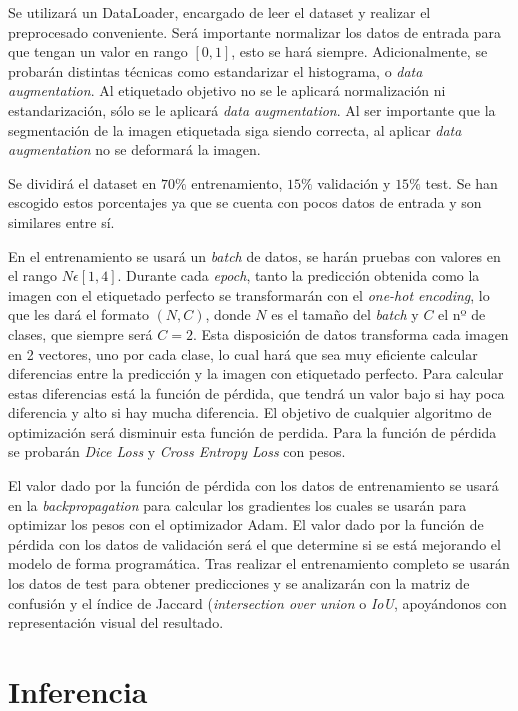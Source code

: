 Se utilizará un DataLoader, encargado de leer el dataset y realizar el preprocesado conveniente. Será importante normalizar los datos de entrada para que tengan un valor en rango $ [0, 1] $, esto se hará siempre. Adicionalmente, se probarán distintas técnicas como estandarizar el histograma, o \textit{data augmentation}. Al etiquetado objetivo no se le aplicará normalización ni estandarización, sólo se le aplicará \textit{data augmentation}. Al ser importante que la segmentación de la imagen etiquetada siga siendo correcta, al aplicar \textit{data augmentation} no se deformará la imagen.

Se dividirá el dataset en $ 70\% $ entrenamiento, $ 15\% $ validación y $ 15\% $ test. Se han escogido estos porcentajes ya que se cuenta con pocos datos de entrada y son similares entre sí.

En el entrenamiento se usará un \textit{batch} de datos, se harán pruebas con valores en el rango $N\epsilon[1,4]$. Durante cada \textit{epoch}, tanto la predicción obtenida como la imagen con el etiquetado perfecto se transformarán con el \textit{one-hot encoding}, lo que les dará el formato $(N, C)$, donde $N$ es el tamaño del \textit{batch} y $C$ el nº de clases, que siempre será $C=2$. Esta disposición de datos transforma cada imagen en 2 vectores, uno por cada clase, lo cual hará que sea muy eficiente calcular diferencias entre la predicción y la imagen con etiquetado perfecto. Para calcular estas diferencias está la función de pérdida, que tendrá un valor bajo si hay poca diferencia y alto si hay mucha diferencia. El objetivo de cualquier algoritmo de optimización será disminuir esta función de perdida. Para la función de pérdida se probarán \textit{Dice Loss} y \textit{Cross Entropy Loss} con pesos.

El valor dado por la función de pérdida con los datos de entrenamiento se usará en la \textit{backpropagation} para calcular los gradientes los cuales se usarán para optimizar los pesos con el optimizador Adam. El valor dado por la función de pérdida con los datos de validación será el que determine si se está mejorando el modelo de forma programática. Tras realizar el entrenamiento completo  se usarán los datos de test para obtener predicciones y se analizarán con la matriz de confusión y el índice de Jaccard (\textit{intersection over union} o \textit{IoU}, apoyándonos con representación visual del resultado.

\pagebreak \section{Inferencia}\label{sec:inferencia}

